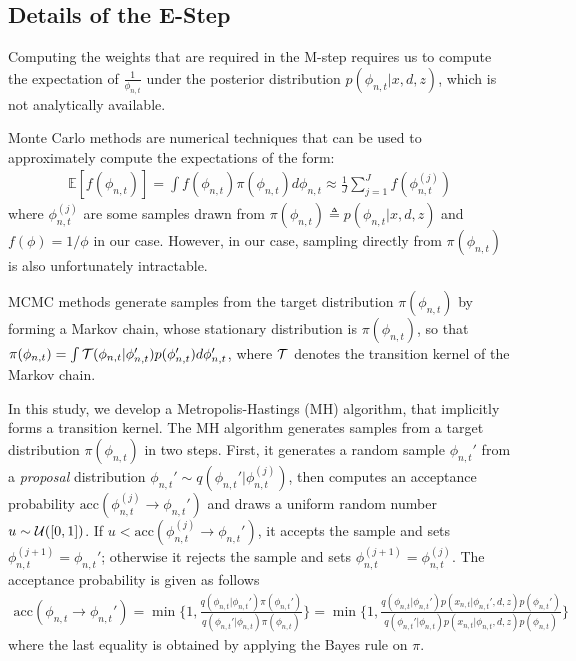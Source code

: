 \begin{appendices}
\chapter{}
\vspace{-20pt}

\section{Details of the E-Step}


Computing the weights that are required in the M-step requires us to compute the expectation of $\frac1{\phi_{n,t}}$ under the posterior distribution $p(\phi_{n,t}|x,d,z)$, which is not analytically available. 

Monte Carlo methods are numerical techniques that can be used to approximately compute the expectations of the form:
\begin{align}
\mathds{E}[f(\phi_{n,t})] = \int f(\phi_{n,t}) \pi(\phi_{n,t}) d\phi_{n,t} \approx \frac1{J} \sum_{j=1}^J f(\phi_{n,t}^{(j)}) \label{eqn:mc}
\end{align}
where $\phi_{n,t}^{(j)}$ are some samples drawn from $\pi(\phi_{n,t}) \triangleq p(\phi_{n,t}|x,d,z)$ and $f(\phi) = 1/\phi$ in our case. However, in our case, sampling directly from $\pi(\phi_{n,t})$ is also unfortunately intractable.


MCMC methods generate samples from the target distribution $\pi(\phi_{n,t})$ by forming a Markov chain, whose stationary distribution is $\pi(\phi_{n,t})$, 
%
so that $\pi(\phi_{n,t}) = \int {\cal T}(\phi_{n,t}|\phi_{n,t}') p(\phi_{n,t}') d\phi_{n,t}'$, where ${\cal T}$ denotes the transition kernel of the Markov chain. 

In this study, we develop a Metropolis-Hastings (MH) algorithm, that implicitly forms a transition kernel. 
%
The MH algorithm generates samples from a target distribution $\pi(\phi_{n,t})$ in two steps. First, it generates a random sample $\phi_{n,t}'$ from a \emph{proposal} distribution $\phi_{n,t}' \sim q(\phi_{n,t}'|\phi_{n,t}^{(j)})$, then computes an acceptance probability $\text{acc}(\phi_{n,t}^{(j)} \rightarrow \phi_{n,t}')$ and draws a uniform random number $u \sim {\cal U}([0, 1])$. If $u < \text{acc}(\phi_{n,t}^{(j)} \rightarrow \phi_{n,t}')$, it accepts the sample and sets $\phi_{n,t}^{(j+1)} = \phi_{n,t}'$; otherwise it rejects the sample and sets $\phi_{n,t}^{(j+1)} = \phi_{n,t}^{(j)}$. The acceptance probability is given as follows
\begin{align}
\text{acc}(\phi_{n,t} \rightarrow \phi_{n,t}') = \min \Bigr\{1, \frac{q(\phi_{n,t}|\phi_{n,t}') \pi(\phi_{n,t}')}{q(\phi_{n,t}'|\phi_{n,t}) \pi(\phi_{n,t})}\Bigr\} = \min \Bigr\{1, \frac{q(\phi_{n,t}|\phi_{n,t}') p(x_{n,t}|\phi_{n,t}',d,z) p(\phi_{n,t}') }{q(\phi_{n,t}'|\phi_{n,t}) p(x_{n,t}|\phi_{n,t},d,z) p(\phi_{n,t}) }\Bigr\}
\end{align}
where the last equality is obtained by applying the Bayes rule on $\pi$. 


\end{appendices}
